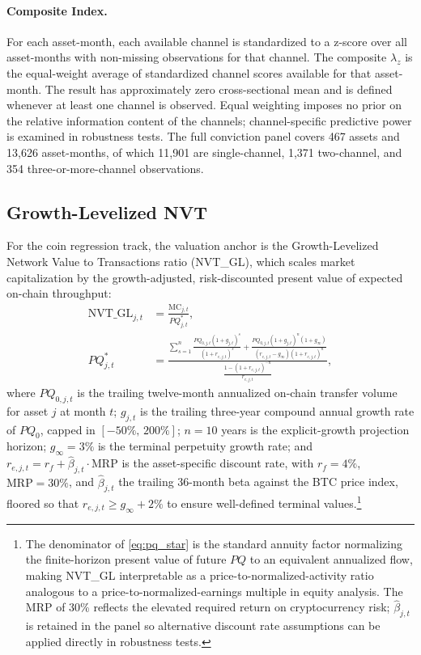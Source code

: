 \documentclass[12pt]{article}
\begin{document}
\paragraph{Composite Index.}
For each asset-month, each available channel is standardized to a z-score over all
asset-months with non-missing observations for that channel. The composite $\lambda_z$ is
the equal-weight average of standardized channel scores available for that asset-month.
The result has approximately zero cross-sectional mean and is defined whenever at least
one channel is observed. Equal weighting imposes no prior on the relative information
content of the channels; channel-specific predictive power is examined in robustness
tests. The full conviction panel covers 467 assets and 13,626 asset-months, of which
11,901 are single-channel, 1,371 two-channel, and 354 three-or-more-channel observations.

\subsection{Growth-Levelized NVT}
\label{sec:measures_nvt}

For the coin regression track, the valuation anchor is the Growth-Levelized Network Value
to Transactions ratio (NVT\_GL), which scales market capitalization by the
growth-adjusted, risk-discounted present value of expected on-chain throughput:
\begin{align}
    \text{NVT\_GL}_{j,t} &= \frac{\text{MC}_{j,t}}{PQ^*_{j,t}}, \label{eq:nvt_gl} \\[6pt]
    PQ^*_{j,t} &= \frac{\displaystyle
        \sum_{s=1}^{n} \frac{PQ_{0,j,t}(1+g_{j,t})^{\!s}}{(1+r_{e,j,t})^{\!s}}
        + \frac{PQ_{0,j,t}(1+g_{j,t})^{\!n}(1+g_\infty)}{(r_{e,j,t}-g_\infty)(1+r_{e,j,t})^{\!n}}
    }{\displaystyle
        \frac{1-(1+r_{e,j,t})^{-n}}{r_{e,j,t}}
    }, \label{eq:pq_star}
\end{align}
where $PQ_{0,j,t}$ is the trailing twelve-month annualized on-chain transfer volume for
asset $j$ at month $t$; $g_{j,t}$ is the trailing three-year compound annual growth rate
of $PQ_0$, capped in $[-50\%,\,200\%]$; $n = 10$ years is the explicit-growth projection
horizon; $g_\infty = 3\%$ is the terminal perpetuity growth rate; and
$r_{e,j,t} = r_f + \hat{\beta}_{j,t} \cdot \text{MRP}$ is the asset-specific discount
rate, with $r_f = 4\%$, $\text{MRP} = 30\%$, and $\hat{\beta}_{j,t}$ the trailing
36-month beta against the BTC price index, floored so that $r_{e,j,t} \geq g_\infty + 2\%$
to ensure well-defined terminal values.\footnote{The denominator of \eqref{eq:pq_star}
is the standard annuity factor normalizing the finite-horizon present value of future $PQ$
to an equivalent annualized flow, making NVT\_GL interpretable as a
price-to-normalized-activity ratio analogous to a price-to-normalized-earnings multiple
in equity analysis. The MRP of 30\% reflects the elevated required return on
cryptocurrency risk; $\hat\beta_{j,t}$ is retained in the panel so alternative discount
rate assumptions can be applied directly in robustness tests.}
\end{document}
